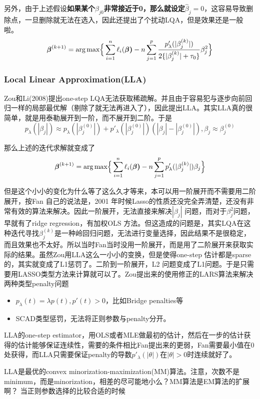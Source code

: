 ﻿\documentclass[hyperref,12pt]{ctexart}
\begin{document}
另外，由于上述假设\textbf{如果某个$\beta_{j0}$非常接近于0，那么就设定$\hat{\beta}_j = 0$}，这容易导致删除点，一旦删除就无法在选入，因此还提出了个扰动LQA，但是效果还是一般啦。
\[
\boldsymbol{\beta}^{(k+1)} = \text{arg\,max}\Big\{\sum^n_{i = 1} \ell_i(\boldsymbol{\beta)} - n \sum^p_{j = 1}\frac{p'_{\lambda}(|\beta_j^{(k)}|)}{2\{|\beta_j^{(k)}| + \tau_0 \}}\beta_j^2\Big\}
\]
\subsubsection{Local Linear Approximation(LLA)}
Zou和Li(2008)提出one-step LQA无法获取稀疏解。并且由于容易犯与逐步向前回归一样的局部最优解（剔除了就无法再进入了），因此提出LLA。其实LLA真的很简单，就是用泰勒展开到一阶，而不展开到二阶。于是
\[
p_{\lambda}(|\beta_j|) \approx p_{\lambda}(|\beta_j^{(0)}|) + p'_{\lambda}(|\beta_j^{(0)}|)(|\beta_j| - |\beta_j^{(0)}|), \beta_j \approx \beta_j^{(0)}
\]

那么上述的迭代求解就变成了
\[
\boldsymbol{\beta}^{(k+1)} = \text{arg\,max}\Big\{\sum^n_{i = 1} \ell_i(\boldsymbol{\beta)} - n \sum^p_{j = 1}p'_{\lambda}(|\beta_j^{(k)}|)\beta_j\Big\}
\]

但是这个小小的变化为什么等了这么久才等来，本可以用一阶展开而不需要用二阶展开，按Fan 自己的说法是，2001 年时候Lasso的性质还没完全弄清楚，还没有非常有效的算法来解决。因此一阶展开，无法直接来解决$|\beta_j|$ 问题，而对于$\beta_j^2$问题，早就有了ridge regression，有加权OLS 方法。但这造成的问题是，其实LQA在这种迭代寻找$\beta_j^{(k)}$是一种岭回归问题，无法进行变量选择，因此结果不是很稳定，而且效果也不太好。所以当时Fan当时没用一阶展开，而是用了二阶展开来获取实际的结果。虽然Zou用LLA这么一小小的变换，但是使得one-step 估计都是sparse的，其实就变成了L1惩罚了。二阶到一阶展开，L2 问题变成了L1问题。于是只需要用LASSO类型方法来计算就可以了。Zou提出来的使用修正的LARS算法来解决两种类型penalty问题
\begin{itemize}
  \item $p_{\lambda}(t) = \lambda p(t), p'(t) > 0$，比如Bridge penalties等
  \item SCAD类型惩罚，无法将正则参数与penalty分开。
\end{itemize}

LLA的one-step estimator，用OLS或者MLE做最初的估计，然后在一步的估计获得的估计能够保证连续性，需要的条件相比Fan提出来的更弱，Fan需要最小值在0 处获得，而LLA只需要保证penalty的导数$p'_{\lambda}(|\theta|)$在$|\theta|>0$时连续就好了。


LLA是最优的convex minorization-maximization(MM)算法。注意，次数不是minimum，而是minorization，相差的尽可能地小么？MM算法是EM算法的扩展啊？
当正则参数选择的比较合适的时候
\end{document}
